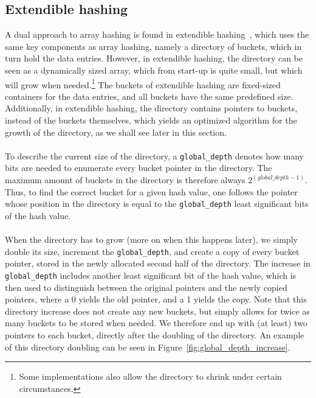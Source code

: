 \documentclass[11pt]{report} %
\begin{document}
\subsection{Extendible hashing}
\label{subsec:background_extendible_hashing}
A dual approach to array hashing is found in extendible hashing~\cite{dms03}, which uses the same key components as array hashing, namely a directory of buckets, which in turn hold the data entries. However, in extendible hashing, the directory can be seen as a dynamically sized array, which from start-up is quite small, but which will grow when needed.\footnote{Some implementations also allow the directory to shrink under certain circumstances.} The buckets of extendible hashing are fixed-sized containers for the data entries, and all buckets have the same predefined size. Additionally, in extendible hashing, the directory contains pointers to buckets, instead of the buckets themselves, which yields an optimized algorithm for the growth of the directory, as we shall see later in this section.\\
\\
To describe the current size of the directory, a \verb|global_depth| denotes how many bits are needed to enumerate every bucket pointer in the directory. The maximum amount of buckets in the directory is therefore always $2^{(global\_depth-1)}$. Thus, to find the correct bucket for a given hash value, one follows the pointer whose position in the directory is equal to the \verb|global_depth| least significant bits of the hash value.\\
\\
When the directory has to grow (more on when this happens later), we simply double its size, increment the \verb|global_depth|, and create a copy of every bucket pointer, stored in the newly allocated second half of the directory. The increase in \verb|global_depth| includes another least significant bit of the hash value, which is then used to distinguish between the original pointers and the newly copied pointers, where a 0 yields the old pointer, and a 1 yields the copy. Note that this directory increase does not create any new buckets, but simply allows for twice as many buckets to be stored when needed. We therefore end up with (at least) two pointers to each bucket, directly after the doubling of the directory. An example of this directory doubling can be seen in Figure~\ref{fig:global_depth_increase}.\\
\end{document}
